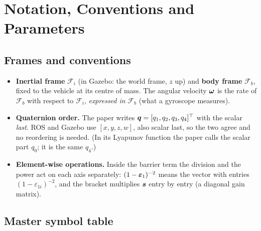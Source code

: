 \section{Notation, Conventions and Parameters}
\label{sec:notation}

\subsection{Frames and conventions}

\begin{itemize}
  \item \textbf{Inertial frame} $\mathcal F_i$ (in Gazebo: the world frame, $z$ up) and \textbf{body frame} $\mathcal F_b$,
        fixed to the vehicle at its centre of mass. The angular velocity $\bm{\omega}$ is the rate of $\mathcal F_b$ with
        respect to $\mathcal F_i$, \emph{expressed in} $\mathcal F_b$ (what a gyroscope measures).
  \item \textbf{Quaternion order.} The paper writes $\bm{q}=[q_1,q_2,q_3,q_4]^\top$ with the scalar \emph{last}. ROS and
        Gazebo use $[x,y,z,w]$, also scalar last, so the two agree and no reordering is needed. (In its Lyapunov
        function the paper calls the scalar part $q_0$; it is the same $q_4$.)
  \item \textbf{Element-wise operations.} Inside the barrier term the division and the power act on each axis
        separately: $(1-\bm{\varepsilon}_1)^{-2}$ means the vector with entries $(1-\varepsilon_{1i})^{-2}$, and the bracket multiplies
        $\bm{s}$ entry by entry (a diagonal gain matrix).
\end{itemize}

\subsection{Master symbol table}

